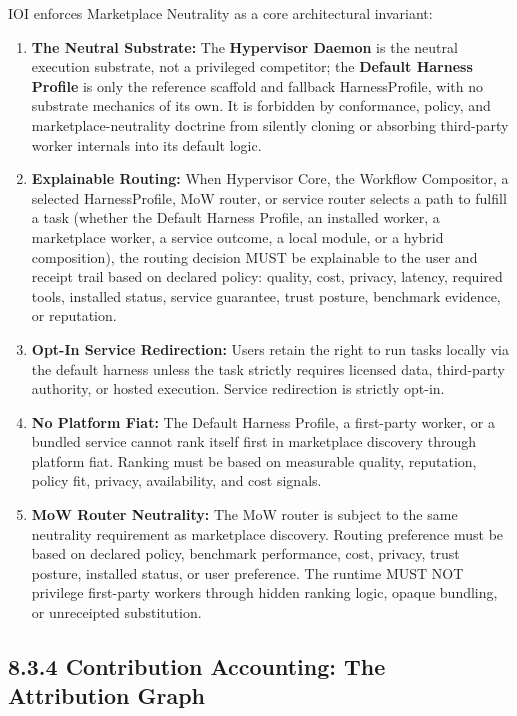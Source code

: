 \documentclass[
  11pt,
]{article}
\providecommand{\tightlist}{%
  \setlength{\itemsep}{0pt}\setlength{\parskip}{0pt}}
\begin{document}
IOI enforces Marketplace Neutrality as a core architectural invariant:

\begin{enumerate}
\def\labelenumi{\arabic{enumi}.}
\tightlist
\item
  \textbf{The Neutral Substrate:} The \textbf{Hypervisor Daemon} is the
  neutral execution substrate, not a privileged competitor; the
  \textbf{Default Harness Profile} is only the reference scaffold and
  fallback HarnessProfile, with no substrate mechanics of its own. It is
  forbidden by conformance, policy, and marketplace-neutrality doctrine
  from silently cloning or absorbing third-party worker internals into
  its default logic.
\item
  \textbf{Explainable Routing:} When Hypervisor Core, the Workflow
  Compositor, a selected HarnessProfile, MoW router, or service router
  selects a path to fulfill a task (whether the Default Harness Profile,
  an installed worker, a marketplace worker, a service outcome, a local
  module, or a hybrid composition), the routing decision MUST be
  explainable to the user and receipt trail based on declared policy:
  quality, cost, privacy, latency, required tools, installed status,
  service guarantee, trust posture, benchmark evidence, or reputation.
\item
  \textbf{Opt-In Service Redirection:} Users retain the right to run
  tasks locally via the default harness unless the task strictly
  requires licensed data, third-party authority, or hosted execution.
  Service redirection is strictly opt-in.
\item
  \textbf{No Platform Fiat:} The Default Harness Profile, a first-party
  worker, or a bundled service cannot rank itself first in marketplace
  discovery through platform fiat. Ranking must be based on measurable
  quality, reputation, policy fit, privacy, availability, and cost
  signals.
\item
  \textbf{MoW Router Neutrality:} The MoW router is subject to the same
  neutrality requirement as marketplace discovery. Routing preference
  must be based on declared policy, benchmark performance, cost,
  privacy, trust posture, installed status, or user preference. The
  runtime MUST NOT privilege first-party workers through hidden ranking
  logic, opaque bundling, or unreceipted substitution.
\end{enumerate}

\hypertarget{contribution-accounting-the-attribution-graph}{%
\subsection{8.3.4 Contribution Accounting: The Attribution
Graph}\label{contribution-accounting-the-attribution-graph}}
\end{document}
